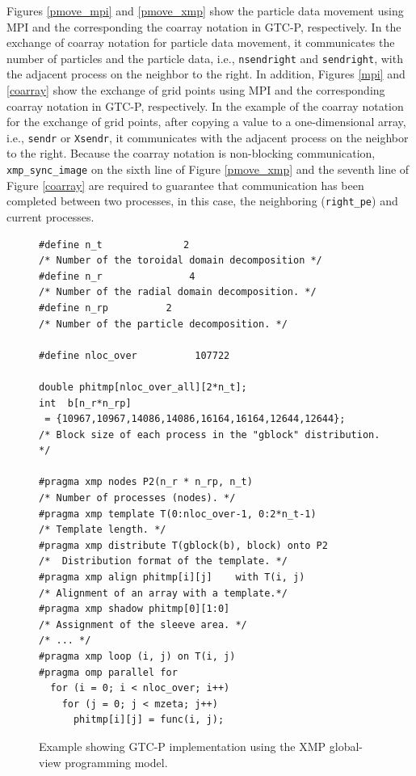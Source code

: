 Figures \ref{pmove_mpi} and \ref{pmove_xmp} show the particle data movement using MPI and the corresponding the coarray notation in GTC-P, respectively. In the exchange of coarray notation for particle data movement, it communicates the number of particles and the particle data, i.e., {\tt nsendright} and {\tt sendright}, with the adjacent process on the neighbor to the right. In addition, Figures \ref{mpi} and \ref{coarray} show the exchange of grid points using MPI and the corresponding coarray notation in GTC-P, respectively. In the example of the coarray notation for the exchange of grid points, after copying a value to a one-dimensional array, i.e., {\tt sendr} or {\tt Xsendr}, it communicates with the adjacent process on the neighbor to the right. Because the coarray notation is non-blocking communication, {\tt xmp\_sync\_image} on the sixth line of Figure \ref{pmove_xmp} and the seventh line of Figure \ref{coarray} are required to guarantee that communication has been completed between two processes, in this case, the neighboring ({\tt right\_pe}) and current processes.


\begin{figure}[t]
\centering
{\scriptsize
\begin{minipage}{8.0cm}
\begin{lstlisting}
#define n_t              2
/* Number of the toroidal domain decomposition */
#define n_r               4
/* Number of the radial domain decomposition. */
#define n_rp          2
/* Number of the particle decomposition. */

#define nloc_over          107722

double phitmp[nloc_over_all][2*n_t];
int  b[n_r*n_rp] 
 = {10967,10967,14086,14086,16164,16164,12644,12644};
/* Block size of each process in the "gblock" distribution. */

#pragma xmp nodes P2(n_r * n_rp, n_t)
/* Number of processes (nodes). */
#pragma xmp template T(0:nloc_over-1, 0:2*n_t-1)
/* Template length. */
#pragma xmp distribute T(gblock(b), block) onto P2
/*  Distribution format of the template. */
#pragma xmp align phitmp[i][j]    with T(i, j)
/* Alignment of an array with a template.*/
#pragma xmp shadow phitmp[0][1:0]
/* Assignment of the sleeve area. */
/* ... */
#pragma xmp loop (i, j) on T(i, j)
#pragma omp parallel for
  for (i = 0; i < nloc_over; i++)
    for (j = 0; j < mzeta; j++)
      phitmp[i][j] = func(i, j);
\end{lstlisting}
\end{minipage}
}
\caption{Example showing GTC-P implementation using the XMP global-view programming model.\label{gblock}}
\end{figure}


